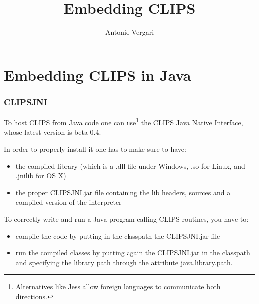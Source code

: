 \documentclass[xcolor={usenames,dvipsnames,svgnames}, compress]{beamer}
\begin{document}
\title{Embedding CLIPS}
\author{Antonio Vergari}

\footnotesize \let\small\footnotesize





{
  \begin{frame}
    \titlepage
  \end{frame}
}






\section{Embedding CLIPS in Java}
{
  \begin{frame}
    \sectionpage
  \end{frame}
}

\begin{frame}
  \frametitle{CLIPSJNI}
  To host CLIPS from Java code one can use\footnote{Alternatives like
    Jess allow foreign languages to communicate both directions.} the
  \href{http://clipsrules.sourceforge.net/CLIPSJNIBeta.html}{\textsf{CLIPS
      Java Native Interface}}, whose latest version is beta
  0.4.\par\bigskip

  In order to properly install it one has to make sure to have:
  \begin{itemize}
  \item the compiled library (which is a \textsf{.dll} file under Windows, \textsf{.so}
    for Linux, and \textsf{.jnilib} for OS X)
    \item the proper CLIPSJNI.jar file containing the lib headers,
      sources and a compiled version of the interpreter
  \end{itemize}\bigskip

  To correctly write and run a Java program calling CLIPS routines,
  you have to:
  \begin{itemize}
  \item compile the code by putting in the classpath the CLIPSJNI.jar
    file
    \item run the compiled classes by putting again the CLIPSJNI.jar
      in the classpath and specifying the library path through the
      attribute \textsf{java.library.path}.
  \end{itemize}
\end{frame}
\end{document}
